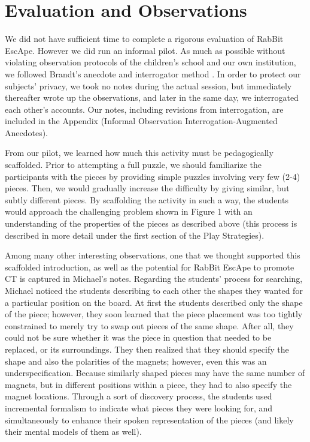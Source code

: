 \documentclass{acm_proc_article-sp}
\begin{document}
\section{Evaluation and Observations}
We did not have sufficient time to complete a rigorous evaluation of RabBit EscApe. However we did run an informal pilot. As much as possible without violating observation protocols of the children's school and our own institution, we followed Brandt's anecdote and interrogator method \cite{brandt1972studying}. In order to protect our subjects' privacy, we took no notes during the actual session, but immediately thereafter wrote up the observations, and later in the same day, we interrogated each other's accounts. Our notes, including revisions from interrogation, are included in the Appendix (Informal Observation Interrogation-Augmented Anecdotes).

From our pilot, we learned how much this activity must be pedagogically scaffolded. Prior to attempting a full puzzle, we should familiarize the participants with the pieces by providing simple puzzles involving very few (2-4) pieces. Then, we would gradually increase the difficulty by giving similar, but subtly different pieces. By scaffolding the activity in such a way, the students would approach the challenging problem shown in Figure 1 with an understanding of the properties of the pieces as described above (this process is described in more detail under the first section of the Play Strategies).

Among many other interesting observations, one that we thought supported this scaffolded introduction, as well as the potential for RabBit EscApe to promote CT is captured in Michael's notes. Regarding the students' process for searching, Michael noticed the students describing to each other the shapes they wanted for a particular position on the board. At first the students described only the shape of the piece; however, they soon learned that the piece placement was too tightly constrained to merely try to swap out pieces of the same shape. After all, they could not be sure whether it was the piece in question that needed to be replaced, or its surroundings. They then realized that they should specify the shape and also the polarities of the magnets; however, even this was an underspecification. Because similarly shaped pieces may have the same number of magnets, but in different positions within a piece, they had to also specify the magnet locations. Through a sort of discovery process, the students used incremental formalism\cite{shipman1999formality} to indicate what pieces they were looking for, and simultaneously to enhance their spoken representation of the pieces (and likely their mental models of them as well).
\end{document}
